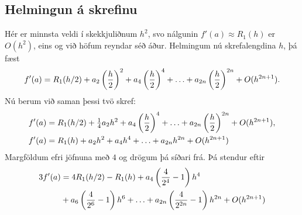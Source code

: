 \documentclass[A4paper,10pt,icelandic]{sphinxmanual}
\begin{document}
\subsection{Helmingun á skrefinu}
\label{kafli04:helmingun-a-skrefinu}
Hér er minnsta veldi í skekkjuliðnum \(h^2\), svo nálgunin
\(f'(a)
\approx R_1(h)\) er \(O(h^2)\), eins og við höfum reyndar séð áður.
Helmingum nú skrefalengdina \(h\), þá fæst
\begin{gather}
\begin{split}f'(a) = R_1(h/2) + a_2 \left(\frac{h}{2}\right)^2
  + a_4 \left(\frac{h}{2}\right)^4 + \ldots
  + a_{2n} \left(\frac{h}{2}\right)^{2n} + O(h^{2n+1}).\end{split}\notag
\end{gather}
Nú berum við saman þessi tvö skref:
\begin{gather}
\begin{split}\begin{aligned}
  f'(a) &= R_1(h/2) + \tfrac 14 a_2 h^2
  + a_4 \left(\frac{h}{2}\right)^4 + \ldots
  + a_{2n} \left(\frac{h}{2}\right)^{2n} + O(h^{2n+1}),\\
  f'(a) &= R_1(h)
  + a_2 h^2 + a_4 h^4 + \ldots + a_{2n} h^{2n} + O(h^{2n+1})\\\end{aligned}\end{split}\notag
\end{gather}
Margföldum efri jöfnuna með \(4\) og drögum þá síðari frá. Þá
stendur eftir
\begin{gather}
\begin{split}\begin{aligned}
  3f'(a) &= 4 R_1(h/2) - R_1(h)
  + a_4 \left( \frac{4}{2^4} - 1 \right)h^4 \\
  &+ a_6 \left( \frac{4}{2^6} - 1 \right)h^6
  + \ldots
  + a_{2n} \left( \frac{4}{2^{2n}} - 1 \right)h^{2n}
  + O(h^{2n+1})\end{aligned}\end{split}\notag
\end{gather}
\end{document}
